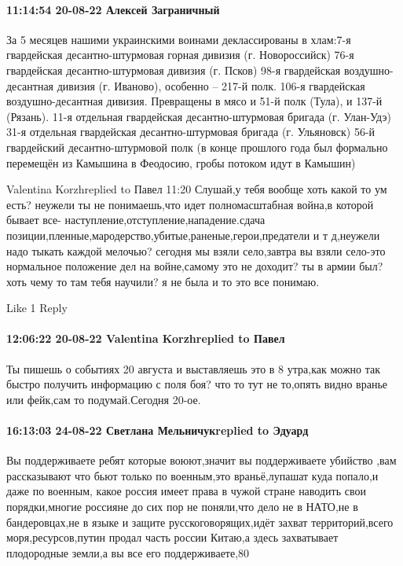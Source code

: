 \paragraph{11:14:54 20-08-22 Алексей Заграничный}

За 5 месяцев нашими украинскими воинами деклассированы в хлам:7-я гвардейская десантно-штурмовая горная дивизия (г. Новороссийск)
76-я гвардейская десантно-штурмовая дивизия (г. Псков)
98-я гвардейская воздушно-десантная дивизия (г. Иваново), особенно – 217-й полк.
106-я гвардейская воздушно-десантная дивизия. Превращены в мясо и 51-й полк (Тула), и 137-й (Рязань).
11-я отдельная гвардейская десантно-штурмовая бригада (г. Улан-Удэ)
31-я отдельная гвардейская десантно-штурмовая бригада (г. Ульяновск)
56-й гвардейский десантно-штурмовой полк (в конце прошлого года был формально перемещён из Камышина в Феодосию, гробы потоком идут в Камышин)

Valentina Korzhreplied to Павел
11:20
Слушай,у тебя вообще хоть какой то ум есть? неужели ты не понимаешь,что идет полномасштабная война,в которой бывает все- наступление,отступление,нападение.сдача позиции,пленные,мародерство,убитые,раненые,герои,предатели и т д,неужели надо тыкать каждой мелочью? сегодня мы взяли село,завтра вы взяли село-это нормальное положение дел на войне,самому это не доходит? ты в армии был? хоть чему то там тебя научили? я не была и то это все понимаю.

    Like 1
    Reply

\paragraph{12:06:22 20-08-22 Valentina Korzhreplied to Павел}

Ты пишешь о событиях 20 августа и выставляешь это в 8 утра,как можно так быстро
получить информацию с поля боя? что то тут не то,опять видно вранье или
фейк,сам то подумай.Сегодня 20-ое.

\paragraph{16:13:03 24-08-22 Светлана Мельничукreplied to Эдуард}

Вы поддерживаете ребят которые воюют,значит вы поддерживаете убийство ,вам
рассказывают что бьют только по военным,это враньё,лупашат куда попало,и даже
по военным, какое россия имеет права в чужой стране наводить свои
порядки,многие россияне до сих пор не поняли,что дело не в НАТО,не в
бандеровцах,не в языке и защите русскоговорящих,идёт захват территорий,всего
моря,ресурсов,путин продал часть россии Китаю,а здесь захватывает плодородные
земли,а вы все его поддерживаете,80%

